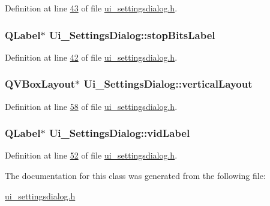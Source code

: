 Definition at line \hyperlink{a00141_source_l00043}{43} of file \hyperlink{a00141_source}{ui\+\_\+settingsdialog.\+h}.

\hypertarget{a00082_a665748b39dda24475690e2363b72e265}{
\subsubsection[{stop\+Bits\+Label}]{\setlength{\rightskip}{0pt plus 5cm}Q\+Label$\ast$ Ui\+\_\+\+Settings\+Dialog\+::stop\+Bits\+Label}}\label{a00082_a665748b39dda24475690e2363b72e265}


Definition at line \hyperlink{a00141_source_l00042}{42} of file \hyperlink{a00141_source}{ui\+\_\+settingsdialog.\+h}.

\hypertarget{a00082_aad19d26806d7e14548233852ac97c26f}{
\subsubsection[{vertical\+Layout}]{\setlength{\rightskip}{0pt plus 5cm}Q\+V\+Box\+Layout$\ast$ Ui\+\_\+\+Settings\+Dialog\+::vertical\+Layout}}\label{a00082_aad19d26806d7e14548233852ac97c26f}


Definition at line \hyperlink{a00141_source_l00058}{58} of file \hyperlink{a00141_source}{ui\+\_\+settingsdialog.\+h}.

\hypertarget{a00082_a50c8fdd36faae6146740e37728af71f2}{
\subsubsection[{vid\+Label}]{\setlength{\rightskip}{0pt plus 5cm}Q\+Label$\ast$ Ui\+\_\+\+Settings\+Dialog\+::vid\+Label}}\label{a00082_a50c8fdd36faae6146740e37728af71f2}


Definition at line \hyperlink{a00141_source_l00052}{52} of file \hyperlink{a00141_source}{ui\+\_\+settingsdialog.\+h}.



The documentation for this class was generated from the following file\+:\begin{DoxyCompactItemize}
\item 
\hyperlink{a00141}{ui\+\_\+settingsdialog.\+h}\end{DoxyCompactItemize}
